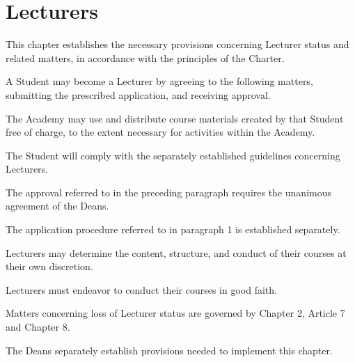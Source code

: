 \newpage
\chapter{Lecturers}
\begin{articles}
  \item This chapter establishes the necessary provisions concerning Lecturer status and related matters, in accordance with the principles of the Charter.
  \item A Student may become a Lecturer by agreeing to the following matters, submitting the prescribed application, and receiving approval.
  \begin{subitems}
    \item The Academy may use and distribute course materials created by that Student free of charge, to the extent necessary for activities within the Academy.
    \item The Student will comply with the separately established guidelines concerning Lecturers.
  \end{subitems}
  \begin{paragraphs}
    \item The approval referred to in the preceding paragraph requires the unanimous agreement of the Deans.
    \item The application procedure referred to in paragraph 1 is established separately.
  \end{paragraphs}
  \item Lecturers may determine the content, structure, and conduct of their courses at their own discretion.
  \item Lecturers must endeavor to conduct their courses in good faith.
  \item Matters concerning loss of Lecturer status are governed by Chapter 2, Article 7 and Chapter 8.
  \item The Deans separately establish provisions needed to implement this chapter.
\end{articles}
